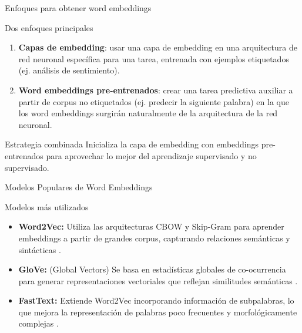 \documentclass[handout]{beamer}
\begin{document}
\begin{frame}{Enfoques para obtener word embeddings}
  \begin{block}{Dos enfoques principales}
    \begin{enumerate}
      \item \textbf{Capas de embedding}: usar una capa de embedding en una arquitectura de red neuronal específica para una tarea, entrenada con ejemplos etiquetados (ej. análisis de sentimiento).
      
      \item \textbf{Word embeddings pre-entrenados}: crear una tarea predictiva auxiliar a partir de corpus no etiquetados (ej. predecir la siguiente palabra) en la que los word embeddings surgirán naturalmente de la arquitectura de la red neuronal.
    \end{enumerate}
  \end{block}
  
  \begin{alertblock}{Estrategia combinada}
    Inicializa la capa de embedding con embeddings pre-entrenados para aprovechar lo mejor del aprendizaje supervisado y no supervisado.
  \end{alertblock}
\end{frame}

\begin{frame}{Modelos Populares de Word Embeddings}
  \begin{block}{Modelos más utilizados}
    \begin{itemize}
      \item \textbf{Word2Vec:} Utiliza las arquitecturas CBOW y Skip-Gram para aprender embeddings a partir de grandes corpus, capturando relaciones semánticas y sintácticas \cite{Mikolov2013}.
      \item \textbf{GloVe:} (Global Vectors) Se basa en estadísticas globales de co-ocurrencia para generar representaciones vectoriales que reflejan similitudes semánticas \cite{penningtonSM14}.
      \item \textbf{FastText:} Extiende Word2Vec incorporando información de subpalabras, lo que mejora la representación de palabras poco frecuentes y morfológicamente complejas \cite{bojanowski2016enriching}.  
    \end{itemize}
  \end{block}

\end{frame}

\end{document}
